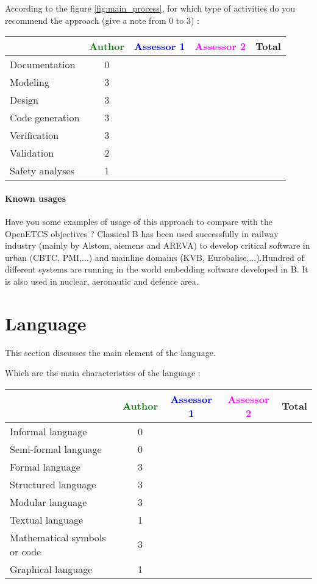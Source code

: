 According to the figure \ref{fig:main_process}, for which type of activities do you recommend the approach (give a note from 0 to  3) :

\begin{tabular}{|l | c | c | c | c|}
\hline
& \textcolor{green}{Author} & \textcolor{blue}{Assessor 1} & \textcolor{magenta}{Assessor 2} & Total \\
\hline 
Documentation & 0 & & &  \\
\hline
Modeling & 3 & & &  \\
\hline
Design & 3 & & & \\
\hline
Code generation & 3 & & & \\
\hline
Verification & 3 & & & \\
\hline
Validation & 2 & & & \\
\hline
Safety analyses & 1 & & & \\
\hline
\end{tabular}

\paragraph{Known usages} Have you some examples of usage of this approach to  compare with the OpenETCS objectives ?
Classical B has been used successfully  in railway  industry (mainly by Alstom, aiemens and AREVA) to  develop critical software in urban (CBTC, PMI,...) and mainline domains (KVB, Eurobalise,...).Hundred of different systems are running in the world embedding software developed in B.
It is also used in nuclear, aeronautic and defence area.

\section{Language}
This section discusses the main element of the language.

Which are the main characteristics of the language :

\begin{tabular}{|l | c | c | c | c|}
\hline
& \textcolor{green}{Author} & \textcolor{blue}{Assessor 1} & \textcolor{magenta}{Assessor 2} & Total \\
\hline 
Informal language & 0 & & &  \\
\hline 
Semi-formal language & 0 & & &  \\
\hline
Formal language & 3 & & &  \\
\hline
Structured language & 3 & & & \\
\hline
Modular language & 3 & & & \\
\hline
Textual language & 1 & & & \\
\hline
Mathematical symbols or code & 3 & & & \\
\hline
Graphical language & 1 & & & \\
\hline
\end{tabular}

